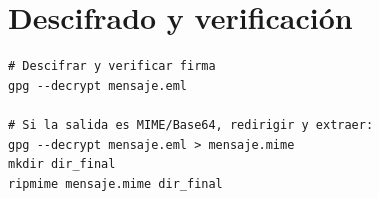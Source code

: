 \documentclass[12pt,a4paper]{report}
\begin{document}
\section{Descifrado y verificación}

\begin{lstlisting}[caption=Comandos para descifrado y extracción de adjuntos]
# Descifrar y verificar firma
gpg --decrypt mensaje.eml

# Si la salida es MIME/Base64, redirigir y extraer:
gpg --decrypt mensaje.eml > mensaje.mime
mkdir dir_final
ripmime mensaje.mime dir_final
\end{lstlisting}
\end{document}
